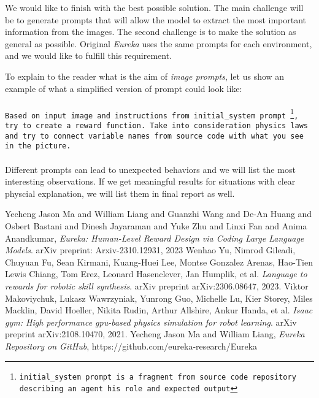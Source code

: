 \documentclass[10pt,twocolumn]{article}
\begin{document}
We would like to finish with the best possible solution. The main challenge will be to generate prompts that will allow the model to extract the most important information from the images. The second challenge is to make the solution as general as possible. Original \textit{Eureka} uses the same prompts for each environment, and we would like to fulfill this requirement.

To explain to the reader what is the aim of \textit{image prompts}, let us show an example of what a simplified version of prompt could look like:
\\\\
\texttt{Based on input image and instructions from initial\_system prompt~\footnote{initial\_system prompt is a fragment from source code repository~\cite{eureka_repo} describing an agent his role and expected output}, try to create a reward function. Take into consideration physics laws and try to connect variable names from source code with what you see in the picture.}
\\\\
Different prompts can lead to unexpected behaviors and we will list the most interesting observations. If we get meaningful results for situations with clear physcial explanation, we will list them in final report as well.


\begin{thebibliography}{9}
Yecheng Jason Ma and William Liang and Guanzhi Wang and De-An Huang and Osbert Bastani and Dinesh Jayaraman and Yuke Zhu and Linxi Fan and Anima Anandkumar, \emph{Eureka: Human-Level Reward Design via Coding Large Language Models}. arXiv preprint: Arxiv-2310.12931, 2023
Wenhao Yu, Nimrod Gileadi, Chuyuan Fu, Sean Kirmani, Kuang-Huei Lee, Montse Gonzalez Arenas, Hao-Tien Lewis Chiang, Tom Erez, Leonard Hasenclever, Jan Humplik, et al. \emph{Language to rewards for robotic skill synthesis}. arXiv preprint arXiv:2306.08647, 2023.
Viktor Makoviychuk, Lukasz Wawrzyniak, Yunrong Guo, Michelle Lu, Kier Storey, Miles Macklin,
David Hoeller, Nikita Rudin, Arthur Allshire, Ankur Handa, et al. \emph{Isaac gym: High performance
gpu-based physics simulation for robot learning}. arXiv preprint arXiv:2108.10470, 2021.
Yecheng Jason Ma and William Liang, \emph{Eureka Repository on GitHub}, https://github.com/eureka-research/Eureka
\end{thebibliography}
\end{document}
